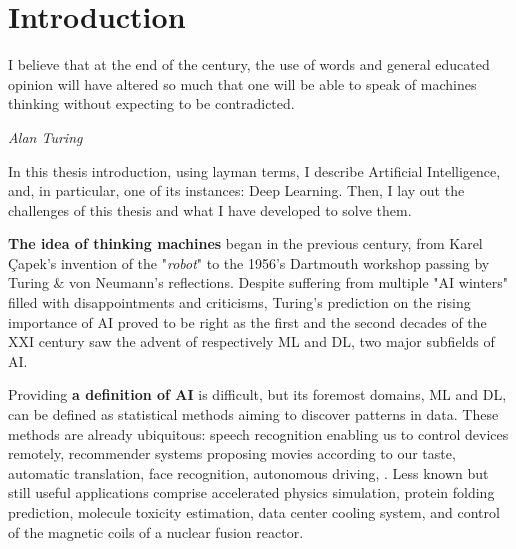 \chapter{Introduction}
\label{chapter:introduction}

{}





\epigraph{I believe that at the end of the century, the use of words and general educated opinion
      will have altered so much that one will be able to speak of machines thinking without expecting to
      be contradicted.}{\textit{Alan Turing}}

In this thesis introduction, using layman terms, I describe Artificial Intelligence, and,
in particular, one of its instances: Deep Learning. Then, I lay out the challenges of this
thesis and what I have developed to solve them.


\textbf{The idea of thinking machines} began in the previous century, from Karel Çapek's invention of the
"\textit{robot}" to the 1956's Dartmouth workshop passing by Turing \& von Neumann's reflections.
Despite suffering from multiple "AI winters" filled with disappointments and criticisms, Turing's
prediction on the rising importance of \ac{AI} proved to be right as the first and the second
decades of the XXI century saw the advent of respectively \acf{ML} and \acf{DL}, two major subfields
of \ac{AI}.

Providing \textbf{a definition of \ac{AI}} is difficult, but its foremost domains, \ac{ML} and \ac{DL}, can be
defined as statistical methods aiming to discover patterns in data. These methods are already
ubiquitous: speech recognition enabling us to control devices remotely, recommender
systems proposing movies according to our taste, automatic translation, face recognition,
autonomous driving, \etc. Less known but still useful applications comprise accelerated physics
simulation, protein folding prediction, molecule toxicity estimation, data center cooling system, and
control of the magnetic coils of a nuclear fusion reactor.

